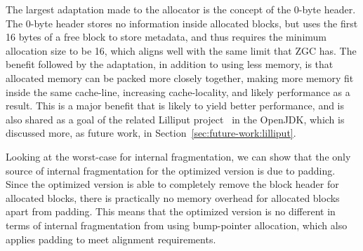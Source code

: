 The largest adaptation made to the allocator is the concept of the 0-byte header. The 0-byte header stores no information inside allocated blocks, but uses the first 16 bytes of a free block to store metadata, and thus requires the minimum allocation size to be 16, which aligns well with the same limit that ZGC has. The benefit followed by the adaptation, in addition to using less memory, is that allocated memory can be packed more closely together, making more memory fit inside the same cache-line, increasing cache-locality, and likely performance as a result. This is a major benefit that is likely to yield better performance, and is also shared as a goal of the related Lilliput project~\cite{lilliput} in the OpenJDK, which is discussed more, as future work, in Section~\ref{sec:future-work:lilliput}.

Looking at the worst-case for internal fragmentation, we can show that the only source of internal fragmentation for the optimized version is due to padding. Since the optimized version is able to completely remove the block header for allocated blocks, there is practically no memory overhead for allocated blocks apart from padding. This means that the optimized version is no different in terms of internal fragmentation from using bump-pointer allocation, which also applies padding to meet alignment requirements.

